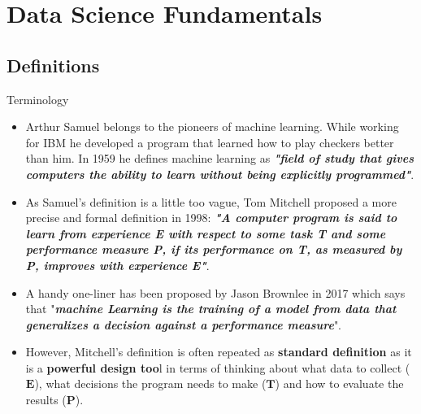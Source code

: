 \documentclass[document.tex]{subfiles}
\begin{document}
    \section{Data Science Fundamentals}
        
    \subsection{Definitions}
    
    \begin{frame}{Terminology}
        \begin{itemize}
            \item Arthur Samuel belongs to the pioneers of machine learning. While working for IBM he developed a program that learned how to play checkers better than him. In 1959 he defines machine learning as \textbf{\textit{"field of study that gives computers the ability to learn without being explicitly programmed"}}.
            \item As Samuel's definition is a little too vague, Tom Mitchell proposed a more precise and formal definition in 1998: \textbf{\textit{"A computer program is said to learn from experience E with respect to some task T and some performance measure P, if its performance on T, as measured by P, improves with experience E"}}.
            \item A handy one-liner has been proposed by Jason Brownlee in 2017 which says that "\textbf{\textit{machine Learning is the training of a model from data that generalizes a decision against a performance measure}}".
            \item However, Mitchell's definition is often repeated as \textbf{standard definition} as it is a \textbf{powerful design too}l in terms of thinking about what data to collect ($\pmb{E}$), what decisions the program needs to make ($\pmb{T}$) and how to evaluate the results ($\pmb{P}$).
        \end{itemize}
    \end{frame}
\end{document}

